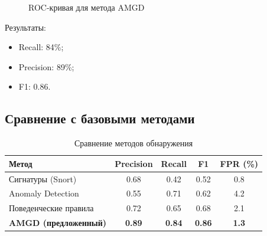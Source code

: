 \documentclass{article}
\begin{document}
\begin{figure}[ht]
\centering
{}
\caption{ROC-кривая для метода AMGD}
\label{fig:roc}
\end{figure}

Результаты:

\begin{itemize}
    \item Recall: 84\%;
    \item Precision: 89\%;
    \item F1: 0.86.
\end{itemize}
\subsection{Сравнение с базовыми методами}

\begin{table}[h]
    \centering
    \caption{Сравнение методов обнаружения}
    \label{tab:comparison1}
    \begin{tabular}{lcccc}
        \toprule
        Метод                        & Precision     & Recall        & F1            & FPR (\%)     \\
        \midrule
        Сигнатуры (Snort)            & 0.68          & 0.42          & 0.52          & 0.8          \\
        Anomaly Detection            & 0.55          & 0.71          & 0.62          & 4.2          \\
        Поведенческие правила        & 0.72          & 0.65          & 0.68          & 2.1          \\
        \textbf{AMGD (предложенный)} & \textbf{0.89} & \textbf{0.84} & \textbf{0.86} & \textbf{1.3} \\
        \bottomrule
    \end{tabular}
\end{table}
\end{document}
